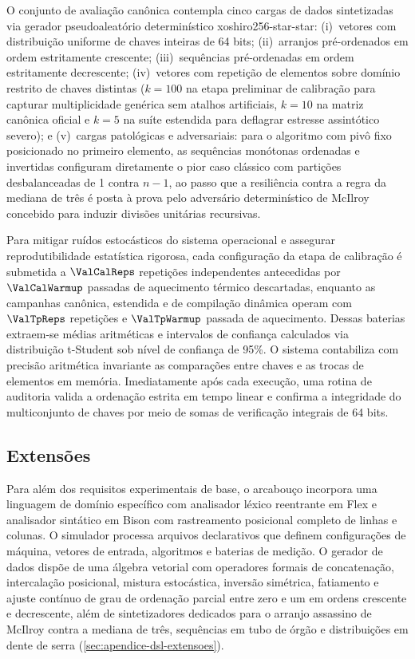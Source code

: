 \documentclass[12pt]{article}
\begin{document}
O conjunto de avaliação canônica contempla cinco cargas de dados sintetizadas via gerador pseudoaleatório determinístico xoshiro256-star-star: (i)~vetores com distribuição uniforme de chaves inteiras de 64 bits; (ii)~arranjos pré-ordenados em ordem estritamente crescente; (iii)~sequências pré-ordenadas em ordem estritamente decrescente; (iv)~vetores com repetição de elementos sobre domínio restrito de chaves distintas ($k=100$ na etapa preliminar de calibração para capturar multiplicidade genérica sem atalhos artificiais, $k=10$ na matriz canônica oficial e $k=5$ na suíte estendida para deflagrar estresse assintótico severo); e (v)~cargas patológicas e adversariais: para o algoritmo com pivô fixo posicionado no primeiro elemento, as sequências monótonas ordenadas e invertidas configuram diretamente o pior caso clássico com partições desbalanceadas de 1 contra $n-1$, ao passo que a resiliência contra a regra da mediana de três é posta à prova pelo adversário determinístico de McIlroy concebido para induzir divisões unitárias recursivas.

Para mitigar ruídos estocásticos do sistema operacional e assegurar reprodutibilidade estatística rigorosa, cada configuração da etapa de calibração é submetida a $\ValCalReps$ repetições independentes antecedidas por $\ValCalWarmup$ passadas de aquecimento térmico descartadas, enquanto as campanhas canônica, estendida e de compilação dinâmica operam com $\ValTpReps$ repetições e $\ValTpWarmup$ passada de aquecimento. Dessas baterias extraem-se médias aritméticas e intervalos de confiança calculados via distribuição t-Student sob nível de confiança de 95\%. O sistema contabiliza com precisão aritmética invariante as comparações entre chaves e as trocas de elementos em memória. Imediatamente após cada execução, uma rotina de auditoria valida a ordenação estrita em tempo linear e confirma a integridade do multiconjunto de chaves por meio de somas de verificação integrais de 64 bits.

\subsection{Extensões}\label{sec:met-extensoes}

Para além dos requisitos experimentais de base, o arcabouço incorpora uma linguagem de domínio específico com analisador léxico reentrante em Flex e analisador sintático em Bison com rastreamento posicional completo de linhas e colunas. O simulador processa arquivos declarativos que definem configurações de máquina, vetores de entrada, algoritmos e baterias de medição. O gerador de dados dispõe de uma álgebra vetorial com operadores formais de concatenação, intercalação posicional, mistura estocástica, inversão simétrica, fatiamento e ajuste contínuo de grau de ordenação parcial entre zero e um em ordens crescente e decrescente, além de sintetizadores dedicados para o arranjo assassino de McIlroy contra a mediana de três, sequências em tubo de órgão e distribuições em dente de serra (\cref{sec:apendice-dsl-extensoes}).
\end{document}

